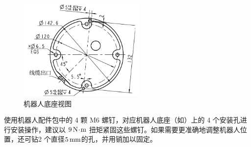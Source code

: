 
\begin{figure}[ht]
    \centering
    \includegraphics[height=5cm]{line_graphs/bottom_surface.pdf}
    \caption{机器人底座视图}
    \label{fig:机器人底座视图}
\end{figure}

使用机器人配件包中的 4 颗 M6 螺钉，对应机器人底座（如）上的 4 个安装孔进行安装操作，建议以 $9\,\mathrm{N\!\cdot\! m}$ 扭矩紧固这些螺钉。如果需要更准确地调整机器人位置，还可钻2 个直径$5 \,\mathrm{mm}$的孔，并用销加以固定。


